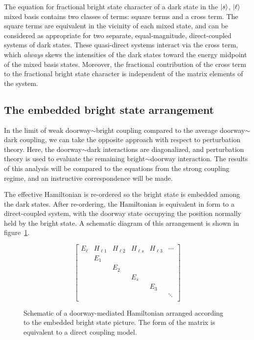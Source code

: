 \documentclass[12pt]{mitthesis}
\begin{document}
The equation for fractional bright state character of a dark state in
the $\mathinner{|{s}\rangle}$, $\mathinner{|{\ell}\rangle}$ mixed basis contains two classes of terms:
square terms and a cross term. The square terms are equivalent in the
vicinity of each mixed state, and can be considered as appropriate for
two separate, equal-magnitude, direct-coupled systems of dark
states. These quasi-direct systems interact via the cross term, which
\emph{always} skews the intensities of the dark states toward the
energy midpoint of the mixed basis states. Moreover, the fractional
contribution of the cross term to the fractional bright state
character is independent of the matrix elements of the system.

\subsection{The embedded bright state arrangement}
\label{sec:ebsa}

In the limit of weak doorway$\sim$bright coupling compared to the average
doorway$\sim$dark coupling, we can take the opposite approach with respect
to perturbation theory. Here, the doorway$\sim$dark interactions are
diagonalized, and perturbation theory is used to evaluate the
remaining bright$\sim$doorway interaction. The results of this analysis
will be compared to the equations from the strong coupling regime, and
an instructive correspondence will be made.

The effective Hamiltonian is re-ordered so the bright state is
embedded among the dark states.  After re-ordering, the Hamiltonian is
equivalent in form to a direct-coupled system, with the doorway state
occupying the position normally held by the bright state.  A schematic
diagram of this arrangement is shown in figure~\ref{fig:matrix-ebsa}.

\begin{figure}
  \caption{Schematic of a doorway-mediated Hamiltonian arranged
    according to the embedded bright state picture. The form of the
    matrix is equivalent to a direct coupling model.}
  \label{fig:matrix-ebsa}
  \begin{equation*}
    \begin{bmatrix}
      E_\ell & H_{\ell 1} & H_{\ell 2} & H_{\ell s} & H_{\ell 3} & \dotsm \\
      & E_1 \\
      & & E_2 \\
      & & & E_s \\
      & & & & E_3 \\
      & & & & & \ddots \\
    \end{bmatrix}
  \end{equation*}
\end{figure}
\end{document}

